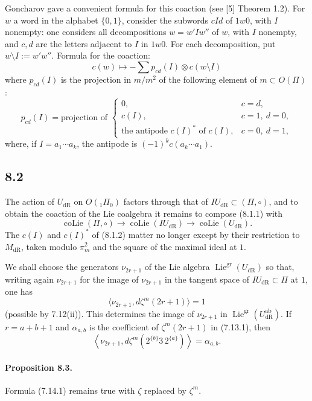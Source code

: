 \documentclass[11pt]{article}
\newcommand{\Lie}{\operatorname{Lie}}
\newcommand{\dR}{\mathrm{dR}}
\newcommand{\ab}{\mathrm{ab}}
\begin{document}
Goncharov gave a convenient formula for this coaction (see [5] Theorem 1.2).
For $w$ a word in the alphabet $\{0,1\}$, consider the subwords $cId$ of $1w0$, with $I$ nonempty: one considers all decompositions $w=w'Iw''$ of $w$, with $I$ nonempty, and $c,d$ are the letters adjacent to $I$ in $1w0$.
For each decomposition, put $w\setminus I:=w'w''$.
Formula for the coaction:
\begin{equation}
 c(w)\longmapsto -\sum p_{cd}(I)\otimes c(w\setminus I)
\tag{8.1.1}
\end{equation}
where $p_{cd}(I)$ is the projection in $m/m^2$ of the following element of $m\subset O(\Pi)$:
\begin{equation}
 p_{cd}(I)=\text{projection of }
 \begin{cases}
 0,& c=d,\\
 c(I),& c=1,\ d=0,\\
 \text{the antipode }c(I)^*\text{ of }c(I),& c=0,\ d=1,
 \end{cases}
\tag{8.1.2}
\end{equation}
where, if $I=a_1\cdots a_k$, the antipode is $(-1)^kc(a_k\cdots a_1)$.

\subsection*{8.2}
The action of $U_{\dR}$ on $O({}_1\Pi_0)$ factors through that of $IU_{\dR}\subset(\Pi,\circ)$, and to obtain the coaction of the Lie coalgebra it remains to compose (8.1.1) with
\[
 \operatorname{coLie}(\Pi,\circ)\longrightarrow \operatorname{coLie}(IU_{\dR})\longrightarrow \operatorname{coLie}(U_{\dR}).
\]
The $c(I)$ and $c(I)^*$ of (8.1.2) matter no longer except by their restriction to $M_{\dR}$, taken modulo $\pi_m^2$ and the square of the maximal ideal at $1$.

We shall choose the generators $\nu_{2r+1}$ of the Lie algebra $\Lie^{\mathrm{gr}}(U_{\dR})$ so that, writing again $\nu_{2r+1}$ for the image of $\nu_{2r+1}$ in the tangent space of $IU_{\dR}\subset\Pi$ at $1$, one has
\[
 \langle \nu_{2r+1},d\zeta^m(2r+1)\rangle=1
\]
(possible by 7.12(ii)).
This determines the image of $\nu_{2r+1}$ in $\Lie^{\mathrm{gr}}(U^{\ab}_{\dR})$.
If $r=a+b+1$ and $\alpha_{a,b}$ is the coefficient of $\zeta^m(2r+1)$ in (7.13.1), then
\[
 \left\langle \nu_{2r+1},d\zeta^m(2^{\{b\}}3\,2^{\{a\}})\right\rangle=\alpha_{a,b}.
\]

\paragraph{Proposition 8.3.}
Formula (7.14.1) remains true with $\zeta$ replaced by $\zeta^m$.
\end{document}
